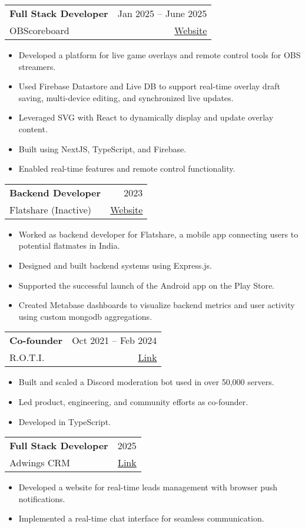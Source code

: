\documentclass[A4,11pt]{article}
\makeatletter
\newcommand{\CVItem}[1]{
  \item\small{
    {#1 \vspace{-2pt}}
  }
}
\newcommand{\CVSubheading}[4]{
  \vspace{-2pt}\item
    \begin{tabular*}{0.97\textwidth}[t]{l@{\extracolsep{\fill}}r}
      \textbf{#1} & #2 \\
      \small#3 & \small #4 \\
    \end{tabular*}\vspace{-7pt}
}
\newcommand{\CVItemListStart}{\begin{itemize}}
\newcommand{\CVItemListEnd}{\end{itemize}\vspace{-5pt}}
\makeatother
\begin{document}
    \CVSubheading
      {Full Stack Developer}{Jan 2025 -- June 2025}
      {OBScoreboard}{\href{https://app.obscoreboard.com/}{\underline{\color{blue} Website}}}
      \CVItemListStart
        \CVItem{Developed a platform for live game overlays and remote control tools for OBS streamers.}
        \CVItem{Used Firebase Datastore and Live DB to support real-time overlay draft saving, multi-device editing, and synchronized live updates.}
        \CVItem{Leveraged SVG with React to dynamically display and update overlay content.}
        \CVItem{Built using NextJS, TypeScript, and Firebase.}
        \CVItem{Enabled real-time features and remote control functionality.}
      \CVItemListEnd

    \CVSubheading
      {Backend Developer}{2023}
      {Flatshare (Inactive)}{\href{https://joinflatshare.com/}{\underline{\color{blue} Website}}}
      \CVItemListStart
        \CVItem{Worked as backend developer for Flatshare, a mobile app connecting users to potential flatmates in India.}
        \CVItem{Designed and built backend systems using Express.js.}
        \CVItem{Supported the successful launch of the Android app on the Play Store.}
        \CVItem{Created Metabase dashboards to visualize backend metrics and user activity using custom mongodb aggregations.}
      \CVItemListEnd


      \CVSubheading
        {Co-founder}{Oct 2021 -- Feb 2024}
        {R.O.T.I.}{\href{https://rotibot.xyz/}{\underline{\color{blue} Link}}}
        \CVItemListStart
          \CVItem{Built and scaled a Discord moderation bot used in over 50,000 servers.}
          \CVItem{Led product, engineering, and community efforts as co-founder.}
          \CVItem{Developed in TypeScript.}
        \CVItemListEnd

      \CVSubheading
        {Full Stack Developer}{2025}
        {Adwings CRM}{\href{https://adwingscrm.com/}{\underline{\color{blue} Link}}}
        \CVItemListStart
          \CVItem{Developed a website for real-time leads management with browser push notifications.}
          \CVItem{Implemented a real-time chat interface for seamless communication.}
        \CVItemListEnd
\end{document}
